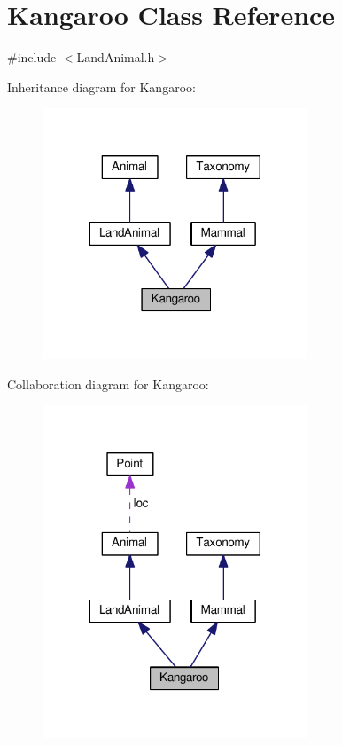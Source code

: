\hypertarget{classKangaroo}{}\section{Kangaroo Class Reference}
\label{classKangaroo}


{\ttfamily \#include $<$Land\+Animal.\+h$>$}



Inheritance diagram for Kangaroo\+:
\nopagebreak
\begin{figure}[H]
\begin{center}
\leavevmode
\includegraphics[width=224pt]{classKangaroo__inherit__graph}
\end{center}
\end{figure}


Collaboration diagram for Kangaroo\+:
\nopagebreak
\begin{figure}[H]
\begin{center}
\leavevmode
\includegraphics[width=224pt]{classKangaroo__coll__graph}
\end{center}
\end{figure}
